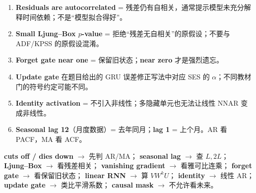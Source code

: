 \documentclass[UTF8,fontset=fandol,10.5pt,a4paper]{ctexart}
\begin{document}
\begin{pitbox}[title={考前英语读题：六个最容易混淆的点}]
\begin{enumerate}[leftmargin=1.7em,itemsep=2pt]
\item \textbf{Residuals are autocorrelated} = 残差仍有自相关，通常提示模型未充分解释时间依赖；不是“模型拟合得好”。
\item \textbf{Small Ljung--Box $p$-value} = 拒绝“残差无自相关”的原假设；不要与 ADF/KPSS 的原假设混淆。
\item \textbf{Forget gate near one} = 保留旧状态；\textbf{near zero} 才是强烈遗忘。
\item \textbf{Update gate} 在题目给出的 GRU 误差修正写法中对应 SES 的 $\alpha$；不同教材门的符号约定可能不同。
\item \textbf{Identity activation} = 不引入非线性；多隐藏单元也无法让线性 NNAR 变成非线性。
\item \textbf{Seasonal lag 12}（月度数据）= 去年同月；\textbf{lag 1} = 上个月。AR 看 PACF，MA 看 ACF。
\end{enumerate}
\end{pitbox}

\begin{exam}[title={最后 3 分钟：英语关键词 $\longrightarrow$ 解题动作}]
\textbf{cuts off / dies down} $\to$ 先判 AR/MA；
\textbf{seasonal lag} $\to$ 查 $L,2L$；
\textbf{Ljung--Box} $\to$ 看残差相关；
\textbf{vanishing gradient} $\to$ 看雅可比连乘；
\textbf{forget gate} $\to$ 看保留旧状态；
\textbf{linear RNN} $\to$ 算 $VW^kU$；
\textbf{identity} $\to$ 线性 AR；
\textbf{update gate} $\to$ 类比平滑系数；
\textbf{causal mask} $\to$ 不允许看未来。
\end{exam}
\end{document}
